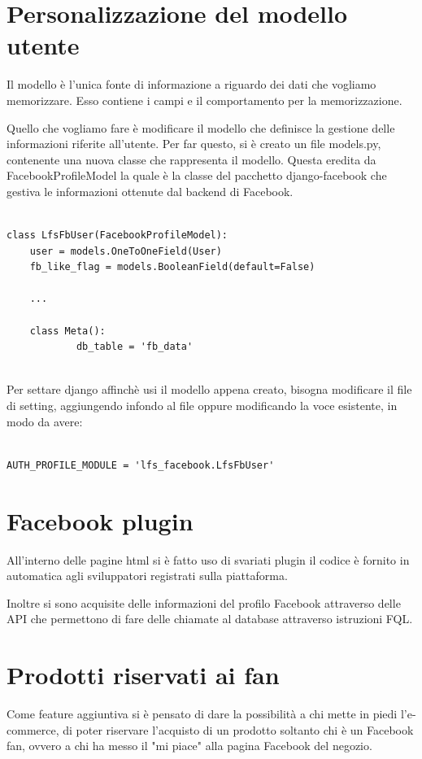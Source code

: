 \section{Personalizzazione del modello utente}
Il modello è l'unica fonte di informazione a riguardo dei dati che vogliamo memorizzare. Esso contiene i campi e il comportamento per la memorizzazione. 

Quello che vogliamo fare è modificare il modello che definisce la gestione delle informazioni riferite all'utente. Per far questo, si è creato un file models.py, contenente una nuova classe che rappresenta il modello. Questa eredita da FacebookProfileModel la quale è la classe del pacchetto django-facebook che gestiva le informazioni ottenute dal backend di Facebook.

\begin{lstlisting}

class LfsFbUser(FacebookProfileModel):
    user = models.OneToOneField(User)
    fb_like_flag = models.BooleanField(default=False)
	
	...	
	
    class Meta():
            db_table = 'fb_data'
            
\end{lstlisting}

Per settare django affinchè usi il modello appena creato, bisogna modificare il file di setting, aggiungendo infondo al file oppure modificando la voce esistente, in modo da avere:

\begin{lstlisting}

AUTH_PROFILE_MODULE = 'lfs_facebook.LfsFbUser'

\end{lstlisting}

\section{Facebook plugin}
All'interno delle pagine html si è fatto uso di svariati plugin il codice è fornito in automatica agli sviluppatori registrati sulla piattaforma.

Inoltre si sono acquisite delle informazioni del profilo Facebook attraverso delle API che permettono di fare delle chiamate al database attraverso istruzioni FQL.

\section{Prodotti riservati ai fan}
Come feature aggiuntiva si è pensato di dare la possibilità a chi mette in piedi l'e-commerce, di poter riservare l'acquisto di un prodotto soltanto chi è un Facebook fan, ovvero a chi ha messo il "mi piace" alla pagina Facebook del negozio.


